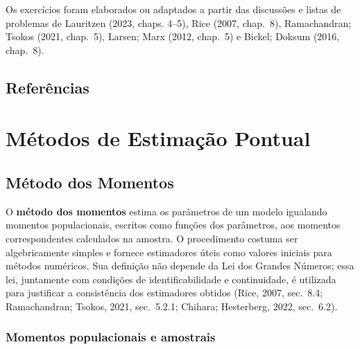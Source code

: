 \documentclass[
  letterpaper,
  DIV=11,
  numbers=noendperiod]{scrreprt}
\begin{document}
Os exercícios foram elaborados ou adaptados a partir das discussões e
listas de problemas de Lauritzen (2023, chaps. 4--5), Rice (2007,
chap.~8), Ramachandran; Tsokos (2021, chap.~5), Larsen; Marx (2012,
chap.~5) e Bickel; Doksum (2016, chap.~8).

\section*{Referências}\label{referuxeancias-2}



\chapter{Métodos de Estimação
Pontual}\label{muxe9todos-de-estimauxe7uxe3o-pontual}

\section{Método dos Momentos}\label{sec-metodo-momentos}

O \textbf{método dos momentos} estima os parâmetros de um modelo
igualando momentos populacionais, escritos como funções dos parâmetros,
aos momentos correspondentes calculados na amostra. O procedimento
costuma ser algebricamente simples e fornece estimadores úteis como
valores iniciais para métodos numéricos. Sua definição não depende da
Lei dos Grandes Números; essa lei, juntamente com condições de
identificabilidade e continuidade, é utilizada para justificar a
consistência dos estimadores obtidos (Rice, 2007, sec.~8.4;
Ramachandran; Tsokos, 2021, sec.~5.2.1; Chihara; Hesterberg, 2022,
sec.~6.2).

\subsection*{Momentos populacionais e
amostrais}\label{momentos-populacionais-e-amostrais}
\end{document}
